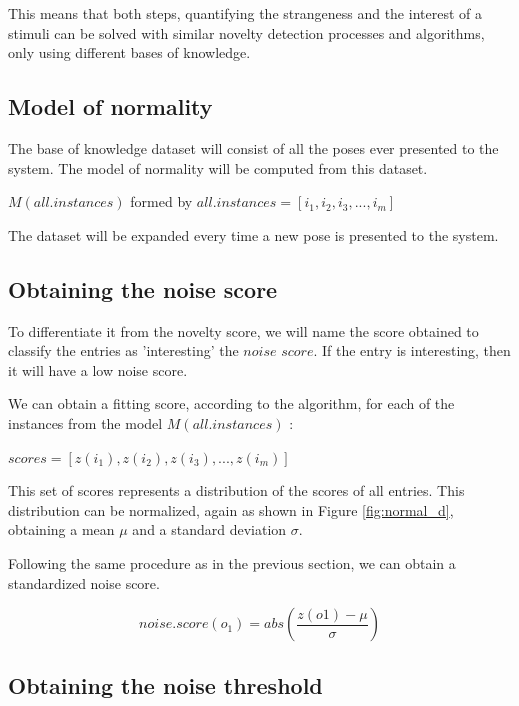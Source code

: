 This means that both steps, quantifying the strangeness and the interest of a stimuli can be solved with similar novelty detection processes and algorithms, only using different bases of knowledge.

\subsection{Model of normality}

The base of knowledge dataset will consist of all the poses ever presented to the system. The model of normality will be computed from this dataset.

\medskip

\centerline{ $ M(all.instances)$ formed by $ all.instances = [i_1, i_2, i_3,..., i_m]  $  }

The dataset will be expanded every time a new pose is presented to the system.

\subsection{Obtaining the noise score}

To differentiate it from the novelty score, we will name the score obtained to classify the entries as 'interesting' the $noise$ $ score$. If the entry is interesting, then it will have a low noise score.

We can obtain a fitting score, according to the algorithm, for each of the instances from the model $ M(all.instances) $ :
\medskip

\centerline{$ scores = [z(i_1), z(i_2), z(i_3),..., z(i_m)] $}

This set of scores represents a distribution of the scores of all entries. This distribution can be normalized, again as shown in Figure \ref{fig:normal_d}, obtaining a mean $\mu$ and a standard deviation $\sigma$.

Following the same procedure as in the previous section, we can obtain a standardized noise score.
 
\begin{equation}
noise.score(o_1) = abs( \dfrac{z(o1) - \mu}{ \sigma})
\end{equation}
 
\subsection{Obtaining the noise threshold} 

\label{thres2}

